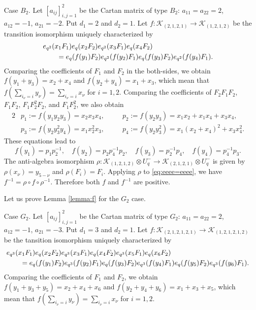 \documentclass[12pt,a4paper]{article}
\newcommand\K{{\mathcal K}}
\theoremstyle{plain} %
\theoremstyle{definition} %
\theoremstyle{definition} %
\numberwithin{theorem}{section}
\numberwithin{equation}{section}
\numberwithin{figure}{section}
\numberwithin{table}{section}
\newcommand\lemmaref[1]{Lemma \ref{#1}}
\begin{document}
Case $B_2$.
Let $[a_{ij}]_{i,j=1}^2$ be the Cartan matrix of type $B_2$:
$a_{11}=a_{22}=2$, $a_{12}=-1$, $a_{21}=-2$.
Put $d_1 = 2$ and $d_2 = 1$. 
Let $f:\K_{(2,1,2,1)}\to \K_{(1,2,1,2)}$ be
the transition isomorphism uniquely characterized by
\begin{align}
 &
 e_{q^2}(x_1F_1)e_q(x_2F_2)       e_{q^2}(x_3F_1)e_q(x_4F_2)
 \notag
 \\ & \qquad =
 e_q(f(y_1)F_2) e_{q^2}(f(y_2)F_1)e_q(f(y_3)F_2) e_{q^2}(f(y_4)F_1).
\label{eq:eeee=eeee}
\end{align}
Comparing the coefficients of $F_1$ and $F_2$ in the both-sides, 
we obtain $f(y_1+y_3)=x_2+x_4$ and $f(y_2+y_4)=x_1+x_3$,
which mean that $f(\sum_{i_\nu=i} y_\nu)=\sum_{i_\nu=i}x_\nu$ for $i=1,2$.
Comparing the coefficients of $F_2F_1F_2$, $F_1F_2$, $F_1F_2^2F_2$,
and $F_1F_2^2$, we also obtain
\begin{alignat*}{2}
 &
 p_1 := f(y_1y_2y_3) = x_2x_3x_4, \quad
 & &
 p_2 := f(y_2y_3) = x_1x_2+x_1x_4+x_3x_4, \quad
 \\ &
 p_3 := f(y_2y_3^2y_4) = x_1x_2^2x_3, \quad
 & &
 p_4 := f(y_2y_3^2) = x_1(x_2+x_4)^2+x_3x_4^2.
\end{alignat*}
These equations lead to
\begin{equation*}
 f(y_1) = p_1 p_2^{-1}, \quad
 f(y_2) = p_2p_4^{-1}p_2, \quad
 f(y_3) = p_2^{-1}p_4, \quad
 f(y_4) = p_4^{-1}p_3.
\end{equation*}
The anti-algebra isomorphism 
$\rho:\K_{(1,2,1,2)}\otimes U_q^-\to\K_{(2,1,2,1)}\otimes U_q^-$
is given by $\rho(x_\nu)=y_{5-\nu}$ and $\rho(F_i)=F_i$.
Applying $\rho$ to \eqref{eq:eeee=eeee}, 
we have $f^{-1}=\rho\circ f\circ\rho^{-1}$.
Therefore both $f$ and $f^{-1}$ are positive.

Let us prove \lemmaref{lemma:f} for the $G_2$ case.

Case $G_2$.
Let $[a_{ij}]_{i,j=1}^2$ be the Cartan matrix of type $G_2$:
$a_{11}=a_{22}=2$, $a_{12}=-1$, $a_{21}=-3$.
Put $d_1 = 3$ and $d_2 = 1$.
Let $f:\K_{(2,1,2,1,2,1)}\to \K_{(1,2,1,2,1,2)}$ be
the tansition isomorphism uniquely characterized by
\begin{align}
 &
 e_{q^3}(x_1F_1)e_q(x_2F_2)       e_{q^3}(x_3F_1)e_q(x_4F_2)       e_{q^3}(x_5F_1)e_q(x_6F_2)
 \notag
 \\ & \qquad =
 e_q(f(y_1)F_2) e_{q^3}(f(y_2)F_1)e_q(f(y_3)F_2) e_{q^3}(f(y_4)F_1)e_q(f(y_5)F_2) e_{q^3}(f(y_6)F_1).
\label{eq:eeeeee=eeeeee}
\end{align}
Comparing the coefficients of $F_1$ and $F_2$, 
we obtain $f(y_1+y_3+y_5)=x_2+x_4+x_6$ and $f(y_2+y_4+y_6)=x_1+x_3+x_5$,
which mean that $f(\sum_{i_\nu=i} y_\nu)=\sum_{i_\nu=i}x_\nu$ for $i=1,2$.
\end{document}
